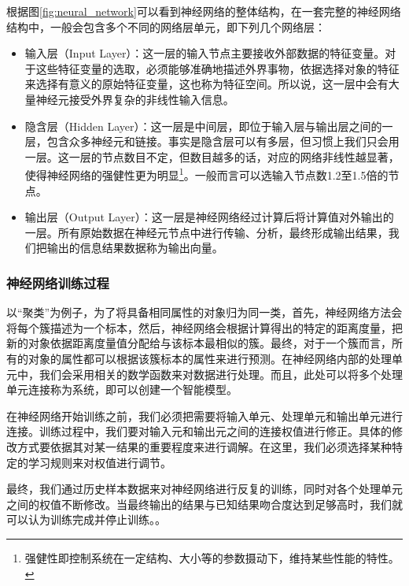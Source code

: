 根据图\ref{fig:neural_network}可以看到神经网络的整体结构，在一套完整的神经网络结构中，一般会包含多个不同的网络层单元，即下列几个网络层：
\begin{itemize}[noitemsep,topsep=0pt,parsep=0pt,partopsep=0pt]
	\item 输入层（Input Layer）：这一层的输入节点主要接收外部数据的特征变量。对于这些特征变量的选取，必须能够准确地描述外界事物，依据选择对象的特征来选择有意义的原始特征变量，这也称为特征空间。所以说，这一层中会有大量神经元接受外界复杂的非线性输入信息。
	\item 隐含层（Hidden Layer）：这一层是中间层，即位于输入层与输出层之间的一层，包含众多神经元和链接。事实是隐含层可以有多层，但习惯上我们只会用一层。这一层的节点数目不定，但数目越多的话，对应的网络非线性越显著，使得神经网络的强健性更为明显\footnote{强健性即控制系统在一定结构、大小等的参数摄动下，维持某些性能的特性。}。一般而言可以选输入节点数1.2至1.5倍的节点。
	\item 输出层（Output Layer）：这一层是神经网络经过计算后将计算值对外输出的一层。所有原始数据在神经元节点中进行传输、分析，最终形成输出结果，我们把输出的信息结果数据称为输出向量。
\end{itemize}

\subsubsection{神经网络训练过程}
以“聚类”为例子，为了将具备相同属性的对象归为同一类，首先，神经网络方法会将每个簇描述为一个标本，然后，神经网络会根据计算得出的特定的距离度量，把新的对象依据距离度量值分配给与该标本最相似的簇。最终，对于一个簇而言，所有的对象的属性都可以根据该簇标本的属性来进行预测\supercite{67}。在神经网络内部的处理单元中，我们会采用相关的数学函数来对数据进行处理。而且，此处可以将多个处理单元连接称为系统，即可以创建一个智能模型。

在神经网络开始训练之前，我们必须把需要将输入单元、处理单元和输出单元进行连接。训练过程中，我们要对输入元和输出元之间的连接权值进行修正。具体的修改方式要依据其对某一结果的重要程度来进行调解。在这里，我们必须选择某种特定的学习规则来对权值进行调节。

最终，我们通过历史样本数据来对神经网络进行反复的训练，同时对各个处理单元之间的权值不断修改。当最终输出的结果与已知结果吻合度达到足够高时，我们就可以认为训练完成并停止训练。\supercite{67}。


